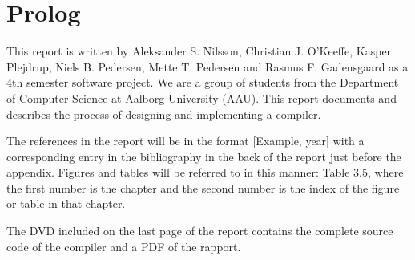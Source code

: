 \chapter{Prolog}
This report is written by Aleksander S. Nilsson, Christian J. O'Keeffe, Kasper Plejdrup, Niels  B. Pedersen, Mette T. Pedersen and Rasmus F. Gadensgaard as a 4th semester software project. We are a group of students from the Department of Computer Science at Aalborg University (AAU). This report documents and describes the process of designing and implementing a compiler.

The references in the report will be in the format [Example, year] with a corresponding entry in the bibliography in the back of the report just before the appendix. Figures and tables will be referred to in this manner: Table 3.5, where the first number is the chapter and the second number is the index of the figure or table in that chapter.

The DVD included on the last page of the report contains the complete source code of the compiler and a PDF of the rapport.
